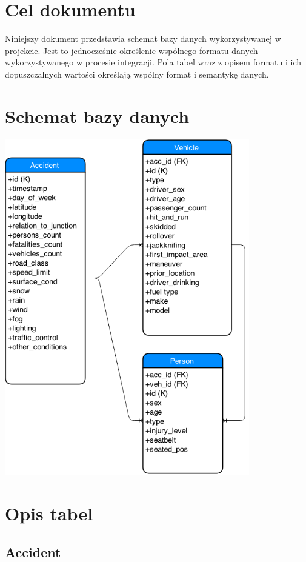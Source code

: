 \section{Cel dokumentu}\label{cel-dokumentu}

Niniejszy dokument przedstawia schemat bazy danych wykorzystywanej w
projekcie. Jest to jednocześnie określenie wspólnego formatu danych
wykorzystywanego w procesie integracji. Pola tabel wraz z opisem formatu
i ich dopuszczalnych wartości określają wspólny format i semantykę
danych.

\section{Schemat bazy danych}\label{schemat-bazy-danych}

\includegraphics[width=0.8\textwidth]{images/database.png}

\section{Opis tabel}\label{opis-tabel}

\subsection{Accident}\label{accident}

